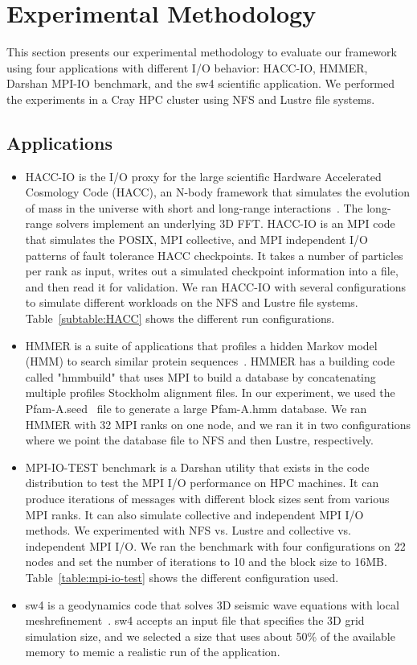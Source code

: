 \section{Experimental Methodology}\label{sec:methodology}
This section presents our experimental methodology to evaluate our
framework using four applications with different I/O behavior:
HACC-IO, HMMER, Darshan MPI-IO benchmark, and the sw4 scientific
application. We performed the experiments in a Cray HPC cluster using
NFS and Lustre file systems.

\subsection{Applications}
\begin{itemize}
	\item HACC-IO is the I/O proxy for the large scientific Hardware Accelerated Cosmology Code (HACC), an N-body framework that simulates the evolution of mass in the universe with short and long-range interactions~\cite{habib2013hacc}. The long-range solvers implement an underlying 3D FFT. HACC-IO is an MPI code that simulates the POSIX, MPI collective, and MPI independent I/O patterns of fault tolerance HACC checkpoints. It takes a number of particles per rank as input, writes out a simulated checkpoint information into a file, and then read it for validation. We ran HACC-IO with several configurations to simulate different workloads on the NFS and Lustre file systems. Table~\ref{subtable:HACC} shows the different run configurations. 
	\item HMMER is a suite of applications that profiles a hidden Markov model (HMM) to search similar protein sequences~\cite{eddy1992hmmer}. HMMER has a building code called "hmmbuild" that uses MPI to build a database by concatenating multiple profiles Stockholm alignment files. In our experiment, we used the Pfam-A.seed~\cite{sonnhammer1998pfam} file to generate a large Pfam-A.hmm database. We ran HMMER with 32 MPI ranks on one node, and we ran it in two configurations where we point the database file to NFS and then Lustre, respectively. 
	\item MPI-IO-TEST benchmark is a Darshan utility that exists in the code distribution to test the MPI I/O performance on HPC machines. It can produce iterations of messages with different block sizes sent from various MPI ranks. It can also simulate collective and independent MPI I/O methods. We experimented with NFS vs. Lustre and collective vs. independent MPI I/O. We ran the benchmark with four configurations on 22 nodes and set the number of iterations to 10 and the block size to 16MB. Table~\ref{table:mpi-io-test} shows the different configuration used.
	\item sw4 is a geodynamics code that solves 3D seismic wave equations with local meshrefinement~\cite{peterssonsw4}. sw4 accepts an input file that specifies the 3D grid simulation size, and we selected a size that uses about 50\% of the available memory to memic a realistic run of the application.
\end{itemize}

